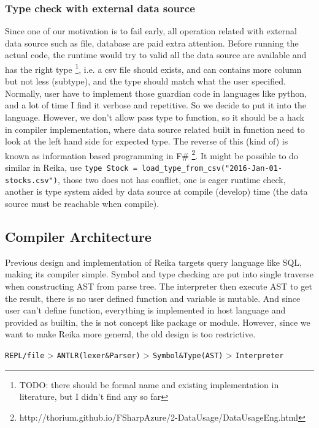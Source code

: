 \documentclass{article}
\begin{document}
\subsubsection{Type check with external data source}
\label{subsubsec:type-check-with-extrenal-data-source}

Since one of our motivation is to fail early, all operation related with external data source such as file, database
are paid extra attention.
Before running the actual code, the runtime would try to valid all the data source are available and has the right type
\footnote{TODO: there should be formal name and existing implementation in literature, but I didn't find any so far},
i.e. a csv file should exists, and can contains more column but not less (subtype),
and the type should match what the user specified.
Normally, user have to implement those guardian code in languages like python, and a lot of time I find it verbose and repetitive.
So we decide to put it into the language.
However, we don't allow pass type to function, so it should be a hack in compiler implementation,
where data source related built in function need to look at the left hand side for expected type.
The reverse of this (kind of) is known as information based programming in F\# \footnote{http://thorium.github.io/FSharpAzure/2-DataUsage/DataUsageEng.html}.
It might be possible to do similar in Reika, use \texttt{type Stock = load\_type\_from\_csv("2016-Jan-01-stocks.csv")},
those two does not has conflict, one is eager runtime check, another is type system aided by data source at compile (develop) time
(the data source must be reachable when compile).

\subsection{Compiler Architecture}
\label{subsec:compiler-architecture}

Previous design and implementation of Reika targets query language like SQL, making its compiler simple.
Symbol and type checking are put into single traverse when constructing AST from parse tree.
The interpreter then execute AST to get the result, there is no user defined function and variable is mutable.
And since user can't define function, everything is implemented in host language and provided as builtin,
the is not concept like package or module.
However, since we want to make Reika more general, the old design is too restrictive.

\begin{center}
  \verb+REPL/file+ > \verb+ANTLR(lexer&Parser)+ > \verb+Symbol&Type(AST)+ > \verb+Interpreter+
\end{center}
\end{document}
